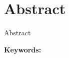 \documentclass[class=NCU_thesis, crop=false]{standalone}
\begin{document}
\chapter{Abstract}

Abstract

\vspace{2em}
\noindent \textbf{Keywords:} \keywordsEn{} %
\end{document}
